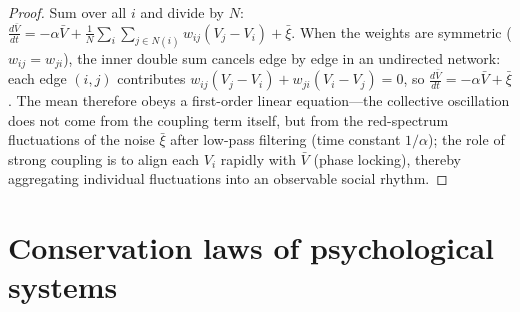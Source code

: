 \begin{proof}
Sum over all $i$ and divide by $N$: $\frac{d\bar V}{dt} = -\alpha \bar V + \frac{1}{N}\sum_{i} \sum_{j \in N(i)} w_{ij}(V_j - V_i) + \bar\xi$. When the weights are symmetric ($w_{ij} = w_{ji}$), the inner double sum cancels edge by edge in an undirected network: each edge $(i,j)$ contributes $w_{ij}(V_j - V_i) + w_{ji}(V_i - V_j) = 0$, so $\frac{d\bar V}{dt} = -\alpha \bar V + \bar\xi$. The mean therefore obeys a first-order linear equation---the collective oscillation does not come from the coupling term itself, but from the red-spectrum fluctuations of the noise $\bar\xi$ after low-pass filtering (time constant $1/\alpha$); the role of strong coupling is to align each $V_i$ rapidly with $\bar V$ (phase locking), thereby aggregating individual fluctuations into an observable social rhythm.
\end{proof}

\section{Conservation laws of psychological systems}

